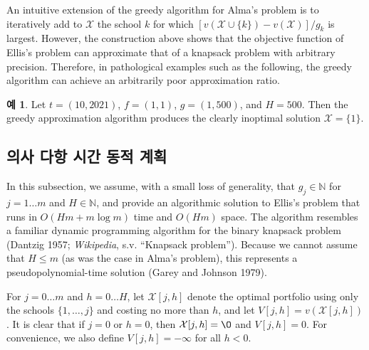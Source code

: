 \documentclass[12pt]{article} %
\newif\ifen
\theoremstyle{definition}
\newtheorem{example}{Example}
\theoremstyle{definition}
\newtheorem{example}{예}
\begin{document}
An intuitive extension of the greedy algorithm for Alma's problem is to iteratively add to $\mathcal{X}$ the school $k$ for which $[ v(\mathcal{X}\cup\{k\}) - v(\mathcal{X}) ] / g_k$ is largest. However, the construction above shows that the objective function of Ellis's problem can approximate that of a knapsack problem with arbitrary precision. Therefore, in pathological examples such as the following, the greedy algorithm can achieve an arbitrarily poor approximation ratio. 
\begin{example}
Let $t = (10, 2021)$, $f = (1, 1)$, $g = (1, 500)$, and $H = 500$. Then the greedy approximation algorithm produces the clearly inoptimal solution $\mathcal{X} = \{1\}$. 
\end{example} 

\ifen \subsection{Pseudopolynomial-time dynamic program} \else\subsection{의사 다항 시간 동적 계획} \fi
In this subsection, we assume, with a small loss of generality, that $g_j \in \mathbb{N}$ for $j = 1\dots m$ and $H \in\mathbb{N}$, and provide an algorithmic solution to Ellis's problem that runs in $O(Hm + m\log m)$ time and $O(Hm)$ space. The algorithm resembles a familiar dynamic programming algorithm for the binary knapsack problem (Dantzig 1957; \emph{Wikipedia}, s.v. ``Knapsack problem''). Because we cannot assume that $H \leq m$ (as was the case in Alma's problem), this represents a pseudopolynomial-time solution (Garey and Johnson 1979).

For $j = 0 \dots m$ and $h = 0 \dots H$, let $\mathcal{X}[j, h]$ denote the optimal portfolio using only the schools $\{ 1, \dots, j\}$ and costing no more than $h$, and let $V[j,h] = v(\mathcal{X}[j, h])$.  It is clear that if $j=0$ or $h=0$, then $\mathcal{X}[j, h] = \O$ and $V[j, h] = 0$.  For convenience, we also define $V[j, h] = -\infty$ for all $h < 0$.
\end{document}
